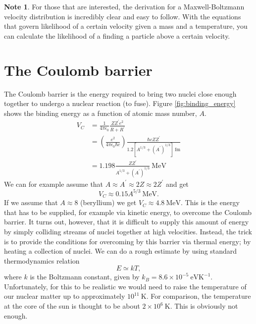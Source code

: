 \documentclass[a4paper,12pt]{article}
\theoremstyle{remark}
\newcommand{\mrm}[1]{\mathrm{#1}}
\renewcommand{\=}[1]{\stackrel{#1}{=}} %
\theoremstyle{plain}
\theoremstyle{definition}
\newtheorem*{definitionT}{Note}%
\newenvironment{note}{
\begin{dBox}
\begin{definitionT}}
{\end{definitionT}
\end{dBox}}
\begin{document}
\begin{note}
For those that are interested, the derivation for a Maxwell-Boltzmann velocity distribution is incredibly clear and easy to follow. With the equations that govern likelihood of a certain velocity given a mass and a temperature, you can calculate the likelihood of a finding a particle above a certain velocity.
\end{note}

\section{The Coulomb barrier }
The Coulomb barrier is the energy required to bring two nuclei close enough together to undergo a nuclear reaction (to fuse). Figure \ref{fig:binding_energy} shows the binding energy as a function of atomic mass number, $A$.
\begin{align}
V_C &= \frac{1}{4\pi\epsilon _0} \frac{Z Z^{\prime} e^{2}}{R+R^{\prime}} \nonumber \\[4pt]
 &= \left( \frac{e^{2}}{4\pi\epsilon _0 \hbar c} \right) \frac{\hbar c ZZ^\prime}{1.2[A^{1/3} + (A^\prime)^{1/3}] \:\mrm{fm}} \nonumber \\[4pt]
 &= 1.198 \frac{Z Z^\prime}{A^{1/3} + (A^\prime)^{1/3}} \:\mrm{MeV}
\end{align} 
We can for example assume that $A \approx A^\prime \approx 2Z \approx 2Z^\prime$ and get 
\begin{equation}
V_C \approx 0.15 A^{5/3} \:\mrm{MeV}.
\end{equation}
If we assume that $A \approx 8$ (beryllium) we get $V_C \approx 4.8 \:\mrm{MeV}$. This is the energy that has to be supplied, for example via kinetic energy, to overcome the Coulomb barrier. It turns out, however, that it is difficult to supply this amount of energy by simply colliding streams of nuclei together at high velocities. Instead, the trick is to provide the conditions for overcoming by this barrier via thermal energy; by heating a collection of nuclei. We can do a rough estimate by using standard thermodynamics relation 
\begin{equation}
E \simeq kT,
\end{equation}
where $k$ is the Boltzmann constant, given by $k_B = 8.6 \times 10^{-5} \: \mrm{eV K}^{-1}$. Unfortunately, for this to be realistic we would need to raise the temperature of our nuclear matter up to approximately $10^{11} \:\mrm{K}$. For comparison, the temperature at the core of the sun is thought to be about $2 \times 10^{6} \:\mrm{K}$. This is obviously not enough. 
\end{document}
